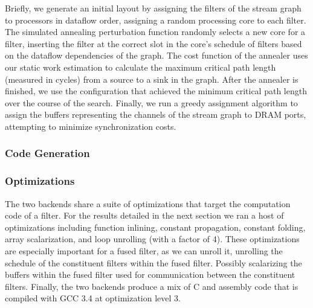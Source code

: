 Briefly, we generate an initial layout by assigning the filters of the
stream graph to processors in dataflow order, assigning a random
processing core to each filter. The simulated annealing perturbation
function randomly selects a new core for a filter, inserting the
filter at the correct slot in the core's schedule of filters based on
the dataflow dependencies of the graph.  The cost function of the
annealer uses our static work estimation to calculate the maximum
critical path length (measured in cycles) from a source to a sink in
the graph.  After the annealer is finished, we use the configuration
that achieved the minimum critical path length over the course of the
search.  Finally, we run a greedy assignment algorithm to assign the
buffers representing the channels of the stream graph to DRAM ports,
attempting to minimize synchronization costs.

\subsubsection{Code Generation}


\subsubsection{Optimizations}

The two backends share a suite of optimizations that target the
computation code of a filter.  For the results detailed in the next
section we ran a host of optimizations including function inlining,
constant propagation, constant folding, array scalarization, and loop
unrolling (with a factor of 4).  These optimizations are especially
important for a fused filter, as we can unroll it, unrolling the
schedule of the constituent filters within the fused filter.  Possibly
scalarizing the buffers within the fused filter used for communication
between the constituent filters.  Finally, the two backends produce a
mix of C and assembly code that is compiled with GCC 3.4 at
optimization level 3.
